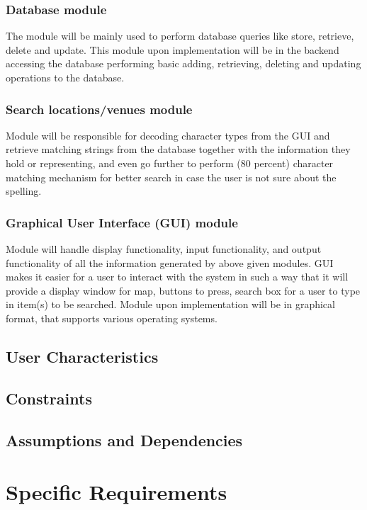 \documentclass[11pt]{article}
\begin{document}
			\subsubsection{Database module}
			The module will be mainly used to perform database queries like store, retrieve, delete and update. This module upon implementation will be in the backend accessing the database performing basic adding, retrieving, deleting and updating operations to the database.
			\subsubsection{Search locations/venues module}
			Module will be responsible for decoding character types from the GUI and retrieve matching strings from the database together with the information they hold or representing, and even go further to perform (80 percent) character matching mechanism for better search in case the user is not sure about the spelling.
			\subsubsection{Graphical User Interface (GUI) module}
			Module will handle display functionality, input functionality, and output functionality of all the information generated by above given modules. GUI makes it easier for a user to interact with the system in such a way that it will provide a display window for map, buttons to press, search box for a user to type in item(s) to be searched. Module upon implementation will be in graphical format, that supports various operating systems.
			
		\subsection{User Characteristics}

		\subsection{Constraints}

		\subsection{Assumptions and Dependencies}

	\section{Specific Requirements}
	
\end{document}
